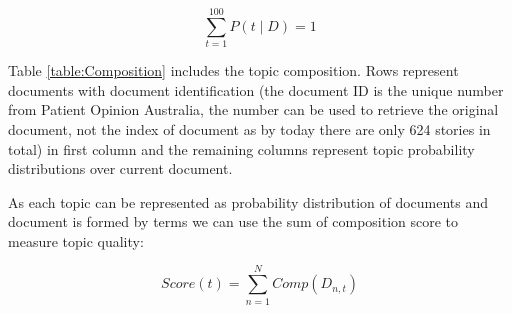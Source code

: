 \documentclass[11pt,twoside]{report}
\begin{document}
\begin{equation}
\sum_{t=1}^{100} P(t\mid D) = 1
\end{equation}

Table \ref{table:Composition} includes the topic composition. Rows represent documents with document identification (the document ID is the unique number from Patient Opinion Australia, the number can be used to retrieve the original document, not the index of document as by today there are only 624 stories in total) in first column and the remaining columns represent topic probability distributions over current document. 

As each topic can be represented as probability distribution of documents and document is formed by terms we can use the sum of composition score to measure topic quality:

\begin{equation}
Score(t) = \sum_{n=1}^N Comp(D_{n,t})
\end{equation}
\end{document}
